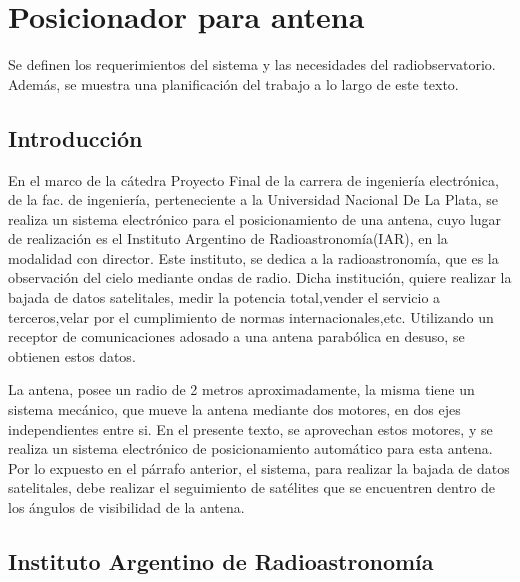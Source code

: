 \renewcommand{\chaptername}{Requerimientos para estación terrena}
\chapter{Posicionador para antena }
\begin{center}
\begin{tcolorbox}[colback=gray!5!white, %
colframe=gray!75!black,
title= \center{\Large{Resumen}} ]

Se definen los requerimientos del sistema y las necesidades del radiobservatorio. Además, se muestra una planificación del trabajo a lo largo de este texto. 
\end{tcolorbox}
\end{center}    
\section{Introducción}  %
En el marco de la cátedra Proyecto Final de la carrera de ingeniería electrónica, de la fac. de ingeniería, perteneciente a la Universidad Nacional De La Plata, se realiza un sistema electrónico para el  posicionamiento de una antena, cuyo lugar de realización es el Instituto Argentino de Radioastronomía(IAR), en la modalidad con director. Este instituto, se dedica a la radioastronomía, que es la observación del cielo mediante ondas de radio. Dicha institución, quiere realizar la bajada de datos satelitales, medir la potencia total,vender el servicio a terceros,velar por el cumplimiento de normas internacionales,etc. Utilizando un receptor de comunicaciones adosado a una antena parabólica en desuso, se obtienen estos datos. 

La antena, posee un radio de 2 metros aproximadamente, la misma tiene un sistema mecánico, que mueve la antena mediante dos motores, en dos ejes independientes entre si. En el presente texto, se aprovechan estos  motores, y se realiza un sistema electrónico de posicionamiento automático para esta antena. Por lo expuesto en el párrafo anterior, el sistema, para realizar la bajada de datos satelitales, debe realizar el seguimiento de satélites que se encuentren dentro de los ángulos de visibilidad de la antena.

\section{Instituto Argentino de Radioastronomía} 

